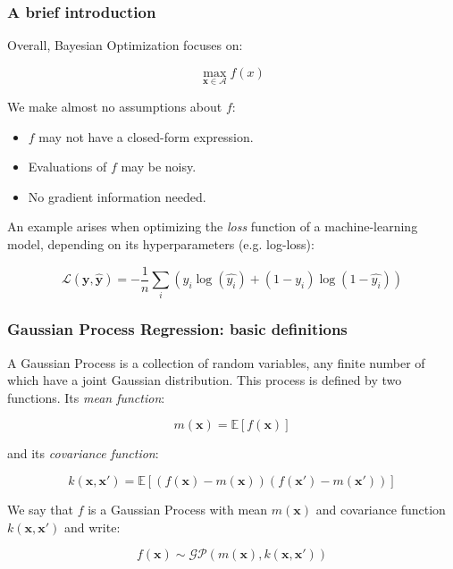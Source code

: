 \documentclass[10pt]{beamer}
\begin{document}
	\begin{frame}
		\frametitle{A brief introduction}
		Overall, Bayesian Optimization focuses on:
		
		\begin{equation}
			\max_{\boldsymbol{x}\in \mathcal{A}} f(x)
		\end{equation}
		
		We make almost no assumptions about $f$:
		\begin{itemize}
			\item $f$ may not have a closed-form expression.
			\item Evaluations of $f$ may be noisy.
			\item No gradient information needed.
		\end{itemize}
		
		An example arises when optimizing the \textit{loss} function of a machine-learning model, depending on its hyperparameters (e.g. log-loss):
		
		\begin{equation}
		\mathcal{L}(\boldsymbol{y}, \boldsymbol{\hat{y}}) = -\dfrac{1}{n} \sum_i \left(y_i \log(\hat{y_i}) + (1 - y_i)\log(1-\hat{y_i})\right)
		\end{equation}

	\end{frame}
	
	\begin{frame}
		\frametitle{Gaussian Process Regression: basic definitions}
		\begin{definition}
			A Gaussian Process is a collection of random variables, any finite number of which have a joint Gaussian distribution. This process is defined by two functions. Its \textit{mean function}:
			
			\begin{equation}
m(\boldsymbol{x}) = \mathbb{E}\left[f(\boldsymbol{x})\right]
			\end{equation}
			
			and its \textit{covariance function}:
			
			\begin{equation}
			k(\boldsymbol{x}, \boldsymbol{x'}) = \mathbb{E}\left[\left( f(\boldsymbol{x}) - m(\boldsymbol{x}) \right)\left( f(\boldsymbol{x}') - m(\boldsymbol{x}')\right)\right]
			\end{equation}
			
			We say that $f$ is a Gaussian Process with mean $m(\boldsymbol{x})$ and covariance function $k(\boldsymbol{x}, \boldsymbol{x}')$ and write:
			
			\begin{equation}
			f(\boldsymbol{x}) \sim \mathcal{GP}\left(m(\boldsymbol{x}), k(\boldsymbol{x}, \boldsymbol{x'}) \right)
			\end{equation}
			
			\end{definition}
		\end{frame}
			
\end{document}
